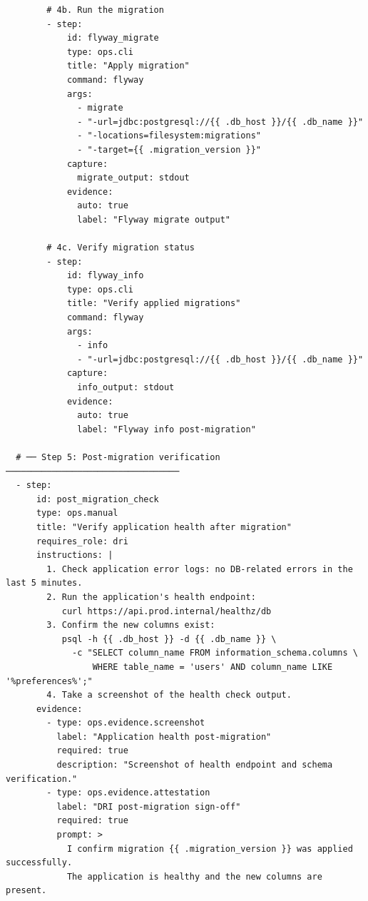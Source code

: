 \begin{verbatim}
        # 4b. Run the migration
        - step:
            id: flyway_migrate
            type: ops.cli
            title: "Apply migration"
            command: flyway
            args:
              - migrate
              - "-url=jdbc:postgresql://{{ .db_host }}/{{ .db_name }}"
              - "-locations=filesystem:migrations"
              - "-target={{ .migration_version }}"
            capture:
              migrate_output: stdout
            evidence:
              auto: true
              label: "Flyway migrate output"

        # 4c. Verify migration status
        - step:
            id: flyway_info
            type: ops.cli
            title: "Verify applied migrations"
            command: flyway
            args:
              - info
              - "-url=jdbc:postgresql://{{ .db_host }}/{{ .db_name }}"
            capture:
              info_output: stdout
            evidence:
              auto: true
              label: "Flyway info post-migration"

  # ── Step 5: Post-migration verification ──────────────────────────────────
  - step:
      id: post_migration_check
      type: ops.manual
      title: "Verify application health after migration"
      requires_role: dri
      instructions: |
        1. Check application error logs: no DB-related errors in the last 5 minutes.
        2. Run the application's health endpoint:
           curl https://api.prod.internal/healthz/db
        3. Confirm the new columns exist:
           psql -h {{ .db_host }} -d {{ .db_name }} \
             -c "SELECT column_name FROM information_schema.columns \
                 WHERE table_name = 'users' AND column_name LIKE '%preferences%';"
        4. Take a screenshot of the health check output.
      evidence:
        - type: ops.evidence.screenshot
          label: "Application health post-migration"
          required: true
          description: "Screenshot of health endpoint and schema verification."
        - type: ops.evidence.attestation
          label: "DRI post-migration sign-off"
          required: true
          prompt: >
            I confirm migration {{ .migration_version }} was applied successfully.
            The application is healthy and the new columns are present.
\end{verbatim}
